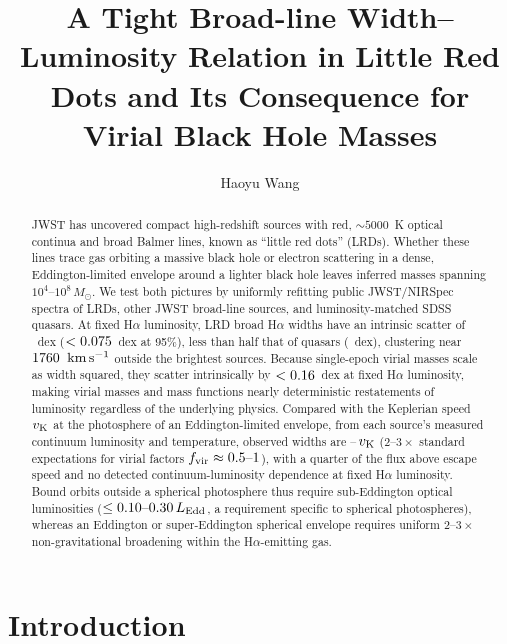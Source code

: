 \documentclass[twocolumn,linenumbers]{aastex701}
\newcommand{\Ha}{H$\alpha$}
\newcommand{\kms}{\ensuremath{{\rm km\,s^{-1}}}}
\newcommand{\vK}{v_{\rm K}}
\providecommand{\Msun}{M_\odot}
\begin{document}
\title{A Tight Broad-line Width--Luminosity Relation in Little Red Dots and Its Consequence for Virial Black Hole Masses}

\author[orcid=0009-0005-9117-0842,gname=Haoyu,sname=Wang]{Haoyu Wang}

\begin{abstract}
JWST has uncovered compact high-redshift sources with red, $\sim 5000$~K optical continua and broad Balmer lines, known as ``little red dots'' (LRDs).
Whether these lines trace gas orbiting a massive black hole or electron scattering in a dense, Eddington-limited envelope around a lighter black hole leaves inferred masses spanning $10^{4}$--$10^{8}\,\Msun$.
We test both pictures by uniformly refitting public JWST/NIRSpec spectra of \NLRD{} LRDs, \NOther{} other JWST broad-line sources, and luminosity-matched SDSS quasars.
At fixed \Ha{} luminosity, LRD broad \Ha{} widths have an intrinsic scatter of \Fsig{}~dex ($<0.075{}$~dex at 95\%), less than half that of quasars (\SsgTwo{}~dex), clustering near $1760{}$~\kms{} outside the \NBright{} brightest sources.
Because single-epoch virial masses scale as width squared, they scatter intrinsically by $<0.16{}$~dex at fixed \Ha{} luminosity, making virial masses and mass functions nearly deterministic restatements of luminosity regardless of the underlying physics.
Compared with the Keplerian speed $\vK$ at the photosphere of an Eddington-limited envelope, from each source's measured continuum luminosity and temperature, observed widths are \ratLo{}--\ratHi{}\,$\vK$ ($2\text{--}3\times$ standard expectations for virial factors $f_{\rm vir}\approx0.5\text{--}1$), with a quarter of the flux above escape speed and no detected continuum-luminosity dependence at fixed \Ha{} luminosity.
Bound orbits outside a spherical photosphere thus require sub-Eddington optical luminosities ($\leq0.10{}\text{--}0.30{}\,L_{\rm Edd}$, a requirement specific to spherical photospheres), whereas an Eddington or super-Eddington spherical envelope requires uniform $2\text{--}3\times$ non-gravitational broadening within the \Ha{}-emitting gas.
\end{abstract}


\section{Introduction} \label{sec:intro}
\end{document}
